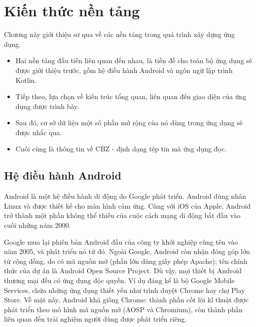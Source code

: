 \documentclass[../../thesis]{subfiles}
\begin{document}
\chapter{Kiến thức nền tảng}\label{chap:fundamental}

Chương này giới thiệu sơ qua về các nền tảng trong quá trình xây dựng ứng dụng.

\begin{itemize}
    \item
        Hai nền tảng đầu tiên liên quan đến nhau, là tiền đề cho toàn bộ ứng
        dụng sẽ được giới thiệu trước, gồm hệ điều hành Android và ngôn ngữ lập
        trình Kotlin.
    \item
        Tiếp theo, lựa chọn về kiến trúc tổng quan, liên quan đến giao diện của
        ứng dụng được trình bày.
    \item
        Sau đó, cơ sở dữ liệu một số phần mở rộng của nó dùng trong ứng dụng sẽ
        được nhắc qua.
    \item
        Cuối cùng là thông tin về CBZ - định dạng tệp tin mà ứng dụng đọc.
\end{itemize}



\section{Hệ điều hành Android}\label{sec:android}

Android là một hệ điều hành di động do Google phát triển. Android dùng nhân
Linux và được thiết kế cho màn hình cảm ứng. Cùng với iOS của Apple, Android trở
thành một phần không thể thiếu của cuộc cách mạng di động bắt đầu vào cuối những
năm 2000.

Google mua lại phiên bản Android đầu của công ty khởi nghiệp cùng tên vào năm
2005, và phát triển nó từ đó. Ngoài Google, Android còn nhận đóng góp lớn từ
cộng đồng, do có mã nguồn mở (phần lớn dùng giấy phép Apache); tên chính thức
của dự án là Android Open Source Project. Dù vậy, mọi thiết bị Android thương
mại đều có ứng dụng độc quyền. Ví dụ đáng kể là bộ Google Mobile Services, chứa
những ứng dụng thiết yếu như trình duyệt Chrome hay chợ Play Store. Về mặt này,
Android khá giống Chrome: thành phần cốt lõi kĩ thuật được phát triển theo mô
hình mã nguồn mở (AOSP và Chromium), còn thành phần liên quan đến trải nghiệm
người dùng được phát triển riêng.
\end{document}
